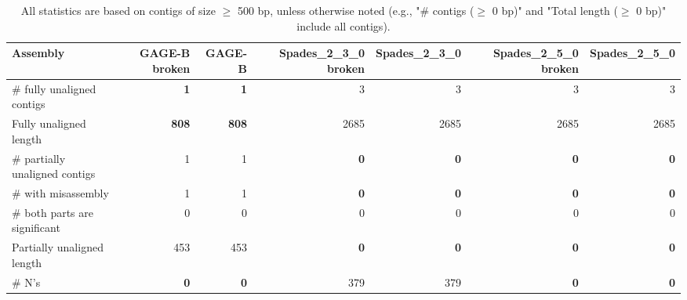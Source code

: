 \documentclass[12pt,a4paper]{article}
\begin{document}
\begin{table}[ht]
\begin{center}
\caption{All statistics are based on contigs of size $\geq$ 500 bp, unless otherwise noted (e.g., "\# contigs ($\geq$ 0 bp)" and "Total length ($\geq$ 0 bp)" include all contigs).}
\begin{tabular}{|l*{6}{|r}|}
\hline
Assembly & GAGE-B broken & GAGE-B & Spades\_2\_3\_0 broken & Spades\_2\_3\_0 & Spades\_2\_5\_0 broken & Spades\_2\_5\_0 \\ \hline
\# fully unaligned contigs & {\bf 1} & {\bf 1} & 3 & 3 & 3 & 3 \\ \hline
Fully unaligned length & {\bf 808} & {\bf 808} & 2685 & 2685 & 2685 & 2685 \\ \hline
\# partially unaligned contigs & 1 & 1 & {\bf 0} & {\bf 0} & {\bf 0} & {\bf 0} \\ \hline
\hspace{5mm}\# with misassembly & 1 & 1 & {\bf 0} & {\bf 0} & {\bf 0} & {\bf 0} \\ \hline
\hspace{5mm}\# both parts are significant & 0 & 0 & 0 & 0 & 0 & 0 \\ \hline
Partially unaligned length & 453 & 453 & {\bf 0} & {\bf 0} & {\bf 0} & {\bf 0} \\ \hline
\# N's & {\bf 0} & {\bf 0} & 379 & 379 & {\bf 0} & {\bf 0} \\ \hline
\end{tabular}
\end{center}
\end{table}
\end{document}
